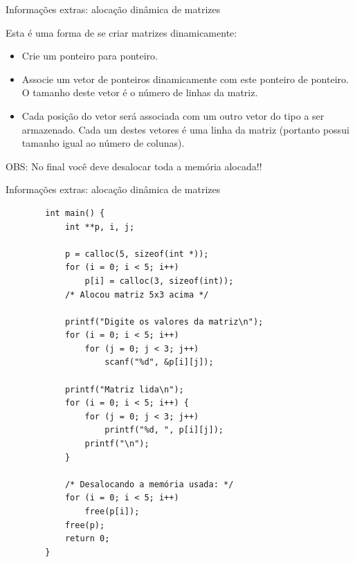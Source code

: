 \documentclass[handout]{beamer}
\begin{document}
\begin{frame}[fragile]{Informações extras: alocação dinâmica de matrizes}

    Esta é uma forma de se criar matrizes dinamicamente:
    \begin{itemize}
        \item Crie um ponteiro para ponteiro.
        \item Associe um vetor de ponteiros dinamicamente com este ponteiro de ponteiro. O tamanho deste vetor é o número de linhas da matriz.
        \item Cada posição do vetor será associada com um outro vetor do tipo a ser armazenado. Cada um destes vetores é uma linha da matriz (portanto possui tamanho igual ao número de colunas).
    \end{itemize}
    
    \alert{OBS: No final você deve desalocar toda a memória alocada!!}

\end{frame}

\begin{frame}[fragile]{Informações extras: alocação dinâmica de matrizes}

    \begin{verbatim}
        int main() {
            int **p, i, j;
            
            p = calloc(5, sizeof(int *));
            for (i = 0; i < 5; i++)
                p[i] = calloc(3, sizeof(int));
            /* Alocou matriz 5x3 acima */

            printf("Digite os valores da matriz\n");
            for (i = 0; i < 5; i++)
                for (j = 0; j < 3; j++)
                    scanf("%d", &p[i][j]);

            printf("Matriz lida\n");
            for (i = 0; i < 5; i++) {
                for (j = 0; j < 3; j++)
                    printf("%d, ", p[i][j]);
                printf("\n");
            }

            /* Desalocando a memória usada: */
            for (i = 0; i < 5; i++)
                free(p[i]);
            free(p);
            return 0;
        }
    \end{verbatim}

\end{frame}


\end{document}
